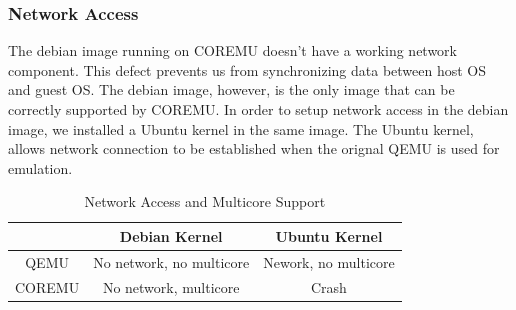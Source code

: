 \subsubsection{Network Access}

The debian image running on COREMU doesn't have a working network component.
This defect prevents us from synchronizing data between host OS and guest OS.
The debian image, however, is the only image that can be correctly supported by 
COREMU. In order to setup network access in the debian image, we installed a 
Ubuntu kernel in the same image. The Ubuntu kernel, allows network connection 
to be established when the orignal QEMU is used for emulation. 

\begin{table}[H]
\center
\begin{tabular} {c|c|c}
 & Debian Kernel & Ubuntu Kernel \\
\hline
QEMU & No network, no multicore & Nework, no multicore \\
COREMU & No network, multicore & Crash
\end{tabular}
\caption{Network Access and Multicore Support}
\end{table}


